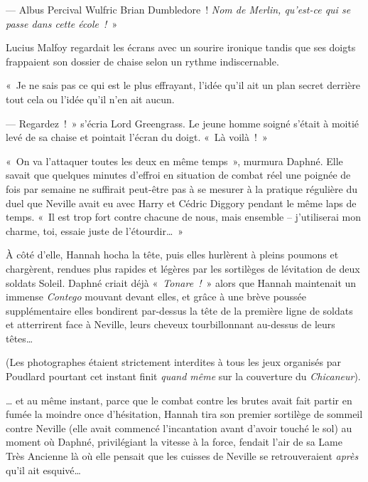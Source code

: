 --- Albus Percival Wulfric Brian Dumbledore~!
\emph{Nom de Merlin, qu'est-ce qui se passe dans cette école~!}~»

Lucius Malfoy regardait les écrans avec un sourire ironique tandis que ses doigts frappaient son dossier de chaise selon un rythme indiscernable.

«~Je ne sais pas ce qui est le plus effrayant, l'idée qu'il ait un plan secret derrière tout cela ou l'idée qu'il n'en ait aucun.

--- Regardez~!~»
s'écria Lord Greengrass.
Le jeune homme soigné s'était à moitié levé de sa chaise et pointait l'écran du doigt.
«~Là voilà~!~»

\later

«~On va l'attaquer toutes les deux en même temps~», murmura Daphné.
Elle savait que quelques minutes d'effroi en situation de combat réel une poignée de fois par semaine ne suffirait peut-être pas à se mesurer à la pratique régulière du duel que Neville avait eu avec Harry et Cédric Diggory pendant le même laps de temps.
«~Il est trop fort contre chacune de nous, mais ensemble -- j'utiliserai mon charme, toi, essaie juste de l'étourdir…~»

À côté d'elle, Hannah hocha la tête, puis elles hurlèrent à pleins poumons et chargèrent, rendues plus rapides et légères par les sortilèges de lévitation de deux soldats Soleil.
Daphné criait déjà «~\emph{Tonare~!}~» alors que Hannah maintenait un immense \emph{Contego} mouvant devant elles, et grâce à une brève poussée supplémentaire elles bondirent par-dessus la tête de la première ligne de soldats et atterrirent face à Neville, leurs cheveux tourbillonnant au-dessus de leurs têtes…

(Les photographes étaient strictement interdites à tous les jeux organisés par Poudlard pourtant cet instant finit \emph{quand même} sur la couverture du \emph{Chicaneur}).

… et au même instant, parce que le combat contre les brutes avait fait partir en fumée la moindre once d'hésitation, Hannah tira son premier sortilège de sommeil contre Neville (elle avait commencé l'incantation avant d'avoir touché le sol) au moment où Daphné, privilégiant la vitesse à la force, fendait l'air de sa Lame Très Ancienne là où elle pensait que les cuisses de Neville se retrouveraient \emph{après} qu'il ait esquivé…

